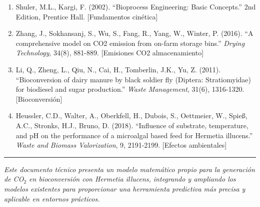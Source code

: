 \documentclass[
]{article}
\begin{document}
\begin{enumerate}
  ``Relationship between temperature and growth rate of bacterial
  cultures.'' \emph{Journal of Bacteriology}, 149(1), 1-5. {[}Modelo
  temperatura{]}
\item
  Shuler, M.L., Kargi, F. (2002). ``Bioprocess Engineering: Basic
  Concepts.'' 2nd Edition, Prentice Hall. {[}Fundamentos cinética{]}
\item
  Zhang, J., Sokhansanj, S., Wu, S., Fang, R., Yang, W., Winter, P.
  (2016). ``A comprehensive model on CO2 emission from on-farm storage
  bins.'' \emph{Drying Technology}, 34(8), 881-889. {[}Emisiones CO2
  almacenamiento{]}
\item
  Li, Q., Zheng, L., Qiu, N., Cai, H., Tomberlin, J.K., Yu, Z. (2011).
  ``Bioconversion of dairy manure by black soldier fly (Diptera:
  Stratiomyidae) for biodiesel and sugar production.'' \emph{Waste
  Management}, 31(6), 1316-1320. {[}Bioconversión{]}
\item
  Heussler, C.D., Walter, A., Oberkfell, H., Dubois, S., Oettmeier, W.,
  Spieß, A.C., Stronks, H.J., Bruno, D. (2018). ``Influence of
  substrate, temperature, and pH on the performance of a microalgal
  based feed for Hermetia illucens.'' \emph{Waste and Biomass
  Valorization}, 9, 2191-2199. {[}Efectos ambientales{]}
\end{enumerate}

\begin{center}\rule{0.5\linewidth}{0.5pt}\end{center}

\emph{Este documento técnico presenta un modelo matemático propio para
la generación de CO$_2$ en bioconversión con Hermetia illucens, integrando
y ampliando los modelos existentes para proporcionar una herramienta
predictiva más precisa y aplicable en entornos prácticos.}
\end{document}
